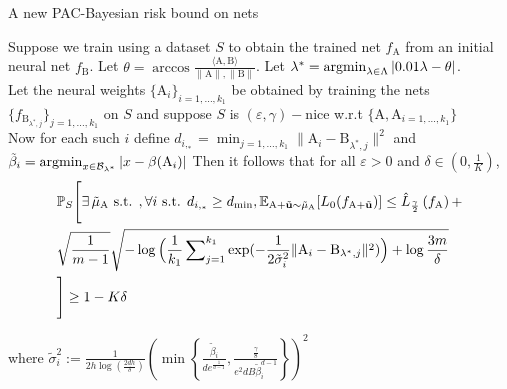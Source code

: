\documentclass[final,t]{beamer}
\renewcommand{\epsilon}{\varepsilon}
\newcommand{\argmin}{\operatornamewithlimits{argmin}}
\newcommand{\norm}[2][]{#1\lVert #2 #1\rVert}
\def\ve#1{\mathchoice{\mbox{\boldmath$\displaystyle\bf#1$}}
{\mbox{\boldmath$\textstyle\bf#1$}}
{\mbox{\boldmath$\scriptstyle\bf#1$}}
{\mbox{\boldmath$\scriptscriptstyle\bf#1$}}}
\renewcommand{\u}{{\ve u}}
\newcommand{\A}{\textrm{A}}
\newcommand{\B}{\textrm{B}}
\begin{document}
\begin{frame}[containsverbatim]
\begin{columns}[t]
\begin{column}{.32\linewidth}
\begin{exampleblock}{A new PAC-Bayesian risk bound on nets}
    \begin{theorem}[{\bf 2}]
    Suppose we train using a dataset $S$ to obtain the trained net $f_{\A}$ from an initial neural net $f_{\B}$. Let $\theta = \arccos\frac{\langle \A, \B \rangle}{\norm{\A}, \norm{\B}}$. Let $\lambda^* = \argmin_{\lambda \in \Lambda}|0.01\lambda - \theta|$.  
    \newline \\ 
    Let the neural weights $\{ \A_i\}_{i=1,\ldots,k_1}$ be obtained by training the nets $\{ f_{\B_{\lambda^*,j}} \}_{j=1,\ldots,k_1}$ on $S$ and suppose $S$ is $(\epsilon,\gamma)-$nice w.r.t $\{ \A, \A_{i=1,\ldots,k_1} \}$
    \newline \\ 
    Now for each such $i$ define $d_{i, _*} = \min_{j=1,\ldots,k_1} \norm{\A_i - \B_{\lambda^*,j}}^2$ and $\tilde{\beta}_i = \argmin_{x \in \mathcal{B}_{\lambda^*}} | x - \beta(\A_i)|$ Then it follows that for all $\epsilon >0$ and $\delta \in (0,\frac{1}{K})$, 
    \begin{align}
    \nonumber &\mathbb{P}_{S} \Bigg [ \exists\, 
    \tilde{\mu}_{\A} \text{ s.t. }, \forall i \text{ s.t. } d_{i,_*} \geq d_{\min},  \mathbb{E}_{\A + \tilde{\u} \sim \tilde{\mu}_{\A}} [ L_{0} (f_{\A + \tilde{\u}}) ] \leq \hat{L}_{\frac \gamma 2} \left (f_{\A} \right ) +\\
    &\nonumber \sqrt{\frac 1 {m-1}}\sqrt{{-\log\Big(  \frac{1}{k_1} \sum\nolimits_{j=1}\nolimits^{k_1}    \exp(- {\frac 1 {2\tilde{\sigma}_i^2}}\|\A_i - \B_{\lambda^*,j}\|^2) \Big) + \log \frac{3m}{\delta}}} \\
    &  \Bigg]\geq 1 - K\delta \label{eq:ours}
    \end{align}

    where $\tilde{\sigma}_i^2 := \frac{1}{2h \log \left ( \frac{2dh}{\delta} \right )}  \left (  \min \left \{  \frac{ \tilde{\beta}_i }{de^{\frac {1}{d-1}}} , \frac{\frac \gamma 8}{e^2dB \tilde{\beta}_i ^{d-1}}  \right \}  \right )^2$ 
    \end{theorem} 
\end{exampleblock}


\end{column}
\end{columns}
\end{frame}
\end{document}
